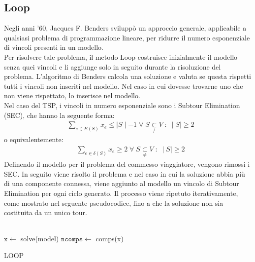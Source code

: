 \subsection{Loop}
Negli anni '60, Jacques F. Benders sviluppò un approccio generale, applicabile a qualsiasi problema di programmazione lineare, per ridurre il numero esponenziale di vincoli presenti in un modello.\\
Per risolvere tale problema, il metodo Loop costruisce inizialmente il modello senza quei vincoli e li aggiunge solo in seguito durante la risoluzione del problema. L'algoritmo di Benders calcola una soluzione e valuta se questa rispetti tutti i vincoli non inseriti nel modello. Nel caso in cui dovesse trovarne uno che non viene rispettato, lo inserisce nel modello.\\ 
Nel caso del TSP, i vincoli in numero esponenziale sono i Subtour Elimination (SEC), che hanno la seguente forma:
\begin{align}
&\underset{e\in E(S)}\sum{x_{e}} \leq \mid S\mid - 1\;\forall\;S\underset{\neq}{\subset}V\; : \; \mid S\mid\geq 2
\end{align}
o equivalentemente:
\begin{align}
&\underset{e\in \delta(S)}\sum{x_{e}}\geq 2\;\forall\;S\underset{\neq}{\subset}V\; : \; \mid S\mid\geq 2
\end{align}
Definendo il modello per il problema del commesso viaggiatore, vengono rimossi i SEC. In seguito viene risolto il problema e nel caso in cui la soluzione abbia più di una componente connessa, viene aggiunto al modello un vincolo di Subtour Elimination per ogni ciclo generato. Il processo viene ripetuto iterativamente, come mostrato nel seguente pseudocodice, fino a che la soluzione non sia costituita da un unico tour.\\\\
\begin{algorithm}[H]
\DontPrintSemicolon
{}
\BlankLine 
 $\mathtt{x} \gets$ solve(model)\;
 $\mathtt{ncomps} \gets$ comps(x)\;
 \BlankLine 
 \caption{LOOP}
\end{algorithm}
